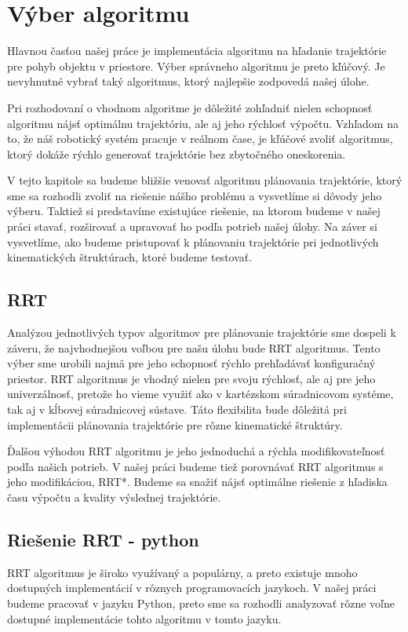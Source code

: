 \section{Výber algoritmu}
\label{kap:3}
Hlavnou časťou našej práce je implementácia algoritmu na hľadanie trajektórie pre pohyb objektu v priestore. Výber správneho algoritmu je preto kľúčový. Je nevyhnutné vybrať taký algoritmus, ktorý najlepšie zodpovedá našej úlohe.

Pri rozhodovaní o vhodnom algoritme je dôležité zohľadniť nielen schopnosť algoritmu nájsť optimálnu trajektóriu, ale aj jeho rýchlosť výpočtu. Vzhľadom na to, že náš robotický systém pracuje v reálnom čase, je kľúčové zvoliť algoritmus, ktorý dokáže rýchlo generovať trajektórie bez zbytočného oneskorenia.

V tejto kapitole sa budeme bližšie venovať algoritmu plánovania trajektórie, ktorý sme sa rozhodli zvoliť na riešenie nášho problému a vysvetlíme si dôvody jeho výberu. Taktiež si predstavíme existujúce riešenie, na ktorom budeme v našej práci stavať, rozširovať a upravovať ho podľa potrieb našej úlohy. Na záver si vysvetlíme, ako budeme pristupovať k plánovaniu trajektórie pri jednotlivých kinematických štruktúrach, ktoré budeme testovať.

\subsection{RRT}

Analýzou jednotlivých typov algoritmov pre plánovanie trajektórie sme dospeli k záveru, že najvhodnejšou voľbou pre našu úlohu bude RRT algoritmus. Tento výber sme urobili najmä pre jeho schopnosť rýchlo prehľadávať konfiguračný priestor. RRT algoritmus je vhodný nielen pre svoju rýchlosť, ale aj pre jeho univerzálnosť, pretože ho vieme využiť ako v kartézskom súradnicovom systéme, tak aj v kĺbovej súradnicovej sústave. Táto flexibilita bude dôležitá pri implementácii plánovania trajektórie pre rôzne kinematické štruktúry.

Ďalšou výhodou RRT algoritmu je jeho jednoduchá a rýchla modifikovateľnosť podľa našich potrieb. V našej práci budeme tiež porovnávať RRT algoritmus s jeho modifikáciou, RRT*. Budeme sa snažiť nájsť optimálne riešenie z hľadiska času výpočtu a kvality výslednej trajektórie.


\subsection{Riešenie RRT - python}
RRT algoritmus je široko využívaný a populárny, a preto existuje mnoho dostupných implementácií v rôznych programovacích jazykoch. V našej práci budeme pracovať v jazyku Python, preto sme sa rozhodli analyzovať rôzne voľne dostupné implementácie tohto algoritmu v tomto jazyku.


